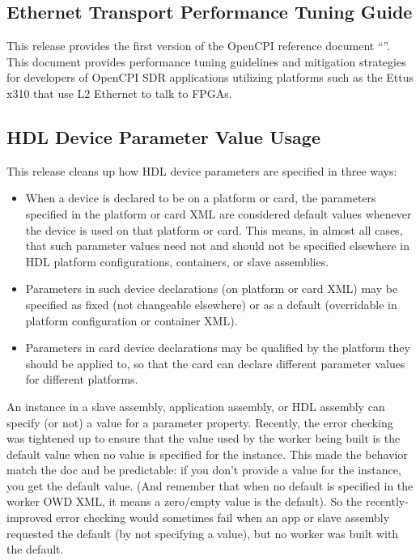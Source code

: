 \subsection{Ethernet Transport Performance Tuning Guide}
\label{sec:25_eth_tuning}
This release provides the first version of the OpenCPI reference document ``''. This document provides performance tuning guidelines and mitigation strategies for developers of OpenCPI SDR applications utilizing platforms such as the Ettus x310 that use L2 Ethernet to talk to FPGAs.\\

\subsection{HDL Device Parameter Value Usage}
\label{sec:25_hdl_parm}
This release cleans up how HDL device parameters are specified in three ways:
\begin{itemize}
\setlength\itemsep{0em} %
\item When a device is declared to be on a platform or card, the parameters specified in the platform or card XML are considered default values whenever the device is used on that platform or card.  This means, in almost all cases, that such parameter values need not and should not be specified elsewhere in HDL platform configurations, containers, or slave assemblies.
\item Parameters in such device declarations (on platform or card XML) may be specified as fixed (not changeable elsewhere) or as a default (overridable in platform configuration or container XML).
\item Parameters in card device declarations may be qualified by the platform they should be applied to, so that the card can declare different parameter values for different platforms.
\end{itemize}
An instance in a slave assembly, application assembly, or HDL assembly can specify (or not) a value for a parameter property.  Recently, the error checking was tightened up to ensure that the value used by the worker being built is the default value when no value is specified for the instance. This made the behavior match the doc and be predictable: if you don't provide a value for the instance, you get the default value. (And remember that when no default is specified in the worker OWD XML, it means a zero/empty value is the default). So the recently-improved error checking would sometimes fail when an app or slave assembly requested the default (by not specifying a value), but no worker was built with the default.\\

